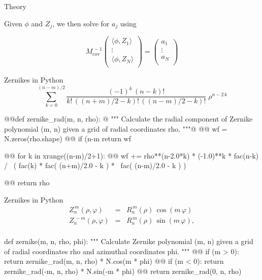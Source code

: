 \documentclass[xetex,10pt]{beamer}
\def\spacer{\vspace*{1em}}
\begin{document}
\begin{frame}[fragile]{Theory}
	
	Given $\phi$ and $Z_j$, we then solve for $a_j$ using
	
	\spacer

	\[
	 M_{\mathrm{cov}}^{\,-1} 
	 \begin{pmatrix}
	 \langle \phi,Z_1 \rangle \\
	 \vdots \\
	 \langle \phi,Z_N \rangle \\
	 \end{pmatrix}
	 =
	 \begin{pmatrix}
	 a_1 \\
	 \vdots \\
	 a_N \\
	 \end{pmatrix}
	\]

\end{frame}

\begin{frame}[fragile]{Zernikes in Python}
	\[
	\sum_{k=0}^{(n-m)/2} \!\!\! \frac{(-1)^k\,(n-k)!}{k!\,((n+m)/2-k)!\,((n-m)/2-k)!} \;\rho^{n-2\,k}
	\]
\begin{python}
@@def zernike_rad(m, n, rho):
@  """
  Calculate the radial component of Zernike polynomial (m, n)
  given a grid of radial coordinates rho.
  """@
@@  wf = N.zeros(rho.shape)
@@  if (n-m %
    return wf
  
@@  for k in xrange((n-m)/2+1):
@@    wf += rho**(n-2.0*k) * (-1.0)**k * fac(n-k) / \
    	( fac(k) * fac( (n+m)/2.0 - k ) * \
      fac( (n-m)/2.0 - k ) )
  
@@  return rho
\end{python}
\end{frame}

\begin{frame}[fragile]{Zernikes in Python}
	\[
	\begin{array}{lcl}
	Z^{\,m}_n(\rho,\varphi) &=& R^{\,m}_{n}(\rho)\,\cos(m\,\varphi) \! \\
	Z^{\,-\!m}_n(\rho,\varphi) &=& R^{\,m}_{n}(\rho)\,\sin(m\,\varphi), \! \\
  	\end{array}
	\]
\spacer
\begin{python}
def zernike(m, n, rho, phi):
  """
  Calculate Zernike polynomial (m, n) given a grid of radial
  coordinates rho and azimuthal coordinates phi.
  """
@@  if (m > 0): return zernike_rad(m, n, rho) * N.cos(m * phi)
@@  if (m < 0): return zernike_rad(-m, n, rho) * N.sin(-m * phi)
@@  return zernike_rad(0, n, rho)
\end{python}
\end{frame}
\end{document}

